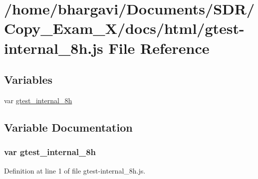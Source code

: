 \hypertarget{gtest-internal__8h_8js}{}\section{/home/bhargavi/\+Documents/\+S\+D\+R/\+Copy\+\_\+\+Exam\+\_\+X/docs/html/gtest-\/internal\+\_\+8h.js File Reference}
\label{gtest-internal__8h_8js}
\subsection*{Variables}
\begin{DoxyCompactItemize}
\item 
var \hyperlink{gtest-internal__8h_8js_aeab4ea100449ddbdc209043769290de4}{gtest\+\_\+internal\+\_\+8h}
\end{DoxyCompactItemize}


\subsection{Variable Documentation}
\subsubsection[{\texorpdfstring{gtest\+\_\+internal\+\_\+8h}{gtest_internal_8h}}]{\setlength{\rightskip}{0pt plus 5cm}var gtest\+\_\+internal\+\_\+8h}\hypertarget{gtest-internal__8h_8js_aeab4ea100449ddbdc209043769290de4}{}\label{gtest-internal__8h_8js_aeab4ea100449ddbdc209043769290de4}


Definition at line 1 of file gtest-\/internal\+\_\+8h.\+js.

